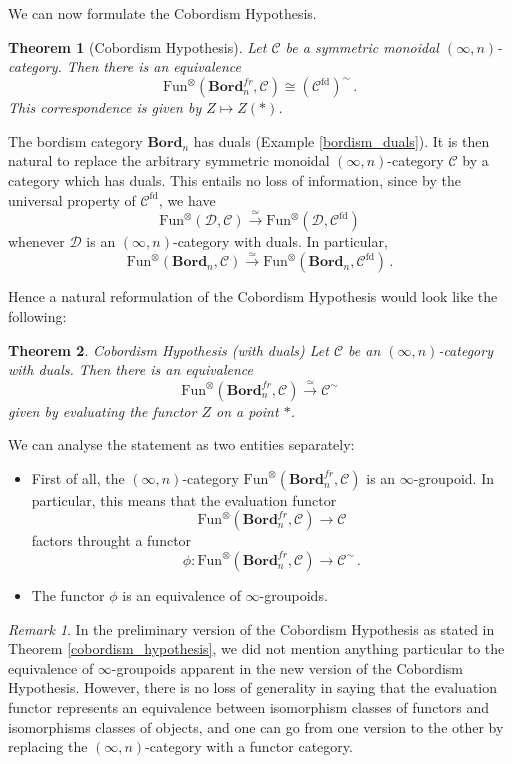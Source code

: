 \documentclass[a4paper,11pt]{article}
\newcommand{\ccal}{\mathcal{C}}
\newcommand{\dcal}{\mathcal{D}}
\theoremstyle{plain}
\newtheorem{thm}{Theorem}[section]
\theoremstyle{definition}
\theoremstyle{remark}
\newtheorem*{rem}{Remark}
\begin{document}
We can now formulate the Cobordism Hypothesis. 

\begin{thm}[Cobordism Hypothesis]
\label{new_cobordism}
Let $\ccal$ be a symmetric monoidal $(\infty, n)$-category. Then there is an equivalence
$$\text{Fun}^{\otimes}(\textbf{Bord}_n^{fr}, \ccal) \cong (\ccal^{\text{fd}})^{\sim}\, .$$
This correspondence is given by $Z \mapsto Z(*)$. 
\end{thm}



The bordism category $\textbf{Bord}_n$ has duals (Example \ref{bordism_duals}). It is then natural to replace the arbitrary symmetric monoidal $(\infty, n)$-category $\ccal$ by a category which has duals. This entails no loss of information, since by the universal property of $\ccal^{\text{fd}}$, we have 
$$\text{Fun}^{\otimes}(\dcal, \ccal) \xrightarrow{\simeq} \text{Fun}^{\otimes}(\dcal, \ccal^{\text{fd}})$$
whenever $\dcal$ is an $(\infty, n)$-category with duals. In particular, 
$$\text{Fun}^{\otimes}(\textbf{Bord}_n, \ccal) \xrightarrow{\simeq} \text{Fun}^{\otimes}(\textbf{Bord}_n, \ccal^{\text{fd}}) \, .$$

Hence a natural reformulation of the Cobordism Hypothesis would look like the following: 

\begin{thm}{Cobordism Hypothesis (with duals)}
Let $\ccal$ be an $(\infty, n)$-category with duals. Then there is an equivalence 
$$\text{Fun}^{\otimes}(\textbf{Bord}_n^{fr}, \ccal) \xrightarrow{\simeq} \ccal^{\sim}$$
given by evaluating the functor $Z$ on a point $*$.
\end{thm}


We can analyse the statement as two entities separately: 
\begin{itemize}
    \item First of all, the $(\infty, n)$-category $\text{Fun}^{\otimes}(\textbf{Bord}_n^{fr}, \ccal)$ is an $\infty$-groupoid. In particular, this means that the evaluation functor 
    $$\text{Fun}^{\otimes}(\textbf{Bord}_n^{fr}, \ccal) \to \ccal$$
    factors throught a functor 
    $$\phi \colon \text{Fun}^{\otimes}(\textbf{Bord}_n^{fr}, \ccal) \to \ccal^{\sim}\, .$$
    \item The functor $\phi$ is an equivalence of $\infty$-groupoids. 
    \end{itemize}

\begin{rem}
In the preliminary version of the Cobordism Hypothesis as stated in Theorem \ref{cobordism_hypothesis}, we did not mention anything particular to the equivalence of $\infty$-groupoids apparent in the new version of the Cobordism Hypothesis. However, there is no loss of generality in saying that the evaluation functor represents an equivalence between isomorphism classes of functors and isomorphisms classes of objects, and one can go from one version to the other by replacing the $(\infty, n)$-category with a functor category. 
\end{rem}
\end{document}

